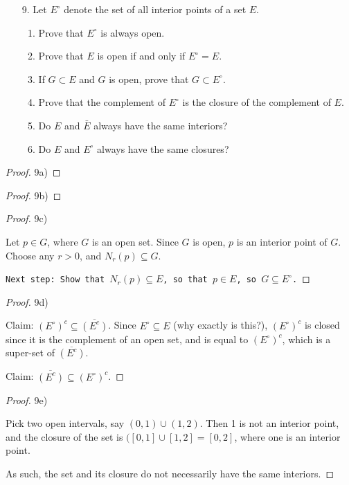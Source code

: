 \documentclass[10pt]{article}
\theoremstyle{definition}
\theoremstyle{plain}
\begin{document}
\pagebreak




\begin{enumerate}
\item[9.] Let $E^\circ$ denote the set of all interior points of a set $E$.
\begin{enumerate}
  \item Prove that $E^\circ$ is always open.
  \item Prove that $E$ is open if and only if $E^\circ = E$.
  \item If $G \subset E$ and $G$ is open, prove that $G\subset E^\circ$.
  \item Prove that the complement of $E^\circ$ is the closure of the complement of $E$.
  \item Do $E$ and $\bar{E}$ always have the same interiors?
  \item Do $E$ and $E^\circ$ always have the same closures?
\end{enumerate}
\end{enumerate}

\begin{proof}
9a)
\end{proof}

\begin{proof}
9b)
\end{proof}

\begin{proof}
9c)

Let $p\in G$, where $G$ is an open set. Since $G$ is open, $p$ is an interior point of $G$. Choose any $r>0$, and $N_r (p) \subseteq G.$

\texttt{Next step: Show that $N_r(p)\subseteq E$, so that $p\in E$, so $G\subseteq E^\circ$.}
\end{proof}

\begin{proof}
9d)

Claim: $(E^\circ)^c \subseteq \overline{(E^c)}$. Since $E^\circ \subseteq E$ (why exactly is this?), $(E^\circ)^c$ is closed since it is the complement of an open set, and is equal to $(E^\circ)^c$, which is a super-set of $\overline{(E^c)}.$

Claim: $\overline{(E^c)} \subseteq (E^\circ)^c$.
\end{proof}

\begin{proof}
9e)

Pick two open intervals, say $(0,1)\cup(1,2)$. Then 1 is not an interior point, and the closure of the set is $([0,1]\cup[1,2] = [0,2]$, where one is an interior point.

As such, the set and its closure do not necessarily have the same interiors.
\end{proof}
\end{document}
